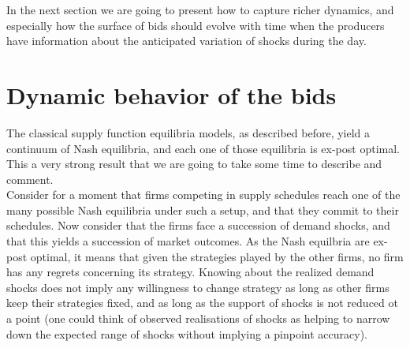 %

In the next section we are going to present how to capture richer dynamics, and especially how the surface of bids should evolve with time when the producers have information about the anticipated variation of shocks during the day. 

\section{Dynamic behavior of the bids} \label{dynamics}
The classical supply function equilibria models, as described before, yield a continuum of Nash equilibria, and each one of those equilibria is ex-post optimal. This a very strong result that we are going to take some time to describe and comment.\\

Consider for a moment that firms competing in supply schedules reach one of the many possible Nash equilibria under such a setup, and that they commit to their schedules. Now consider that the firms face a succession of demand shocks, and that this yields a succession of market outcomes. As the Nash equilbria are ex-post optimal, it means that given the strategies played by the other firms, no firm has any regrets concerning its strategy. Knowing about the realized demand shocks does not imply any willingness to change strategy as long as other firms keep their strategies fixed, and as long as the support of shocks is not reduced ot a point (one could think of observed realisations of shocks as helping to narrow down the expected range of shocks without implying a pinpoint accuracy).\\

